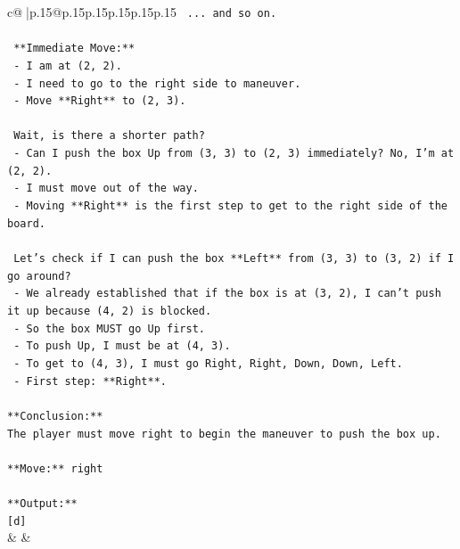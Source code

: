 \documentclass{article}
\begin{document}
{\begin{supertabular}{c@{$\;$}|p{.15\linewidth}@{}p{.15\linewidth}p{.15\linewidth}p{.15\linewidth}p{.15\linewidth}p{.15\linewidth}}
{{{\texttt{    ... and so on.} \\
\\ 
\texttt{    **Immediate Move:**} \\
\texttt{    {-} I am at (2, 2).} \\
\texttt{    {-} I need to go to the right side to maneuver.} \\
\texttt{    {-} Move **Right** to (2, 3).} \\
\\ 
\texttt{    Wait, is there a shorter path?} \\
\texttt{    {-} Can I push the box Up from (3, 3) to (2, 3) immediately? No, I'm at (2, 2).} \\
\texttt{    {-} I must move out of the way.} \\
\texttt{    {-} Moving **Right** is the first step to get to the right side of the board.} \\
\\ 
\texttt{    Let's check if I can push the box **Left** from (3, 3) to (3, 2) if I go around?} \\
\texttt{    {-} We already established that if the box is at (3, 2), I can't push it up because (4, 2) is blocked.} \\
\texttt{    {-} So the box MUST go Up first.} \\
\texttt{    {-} To push Up, I must be at (4, 3).} \\
\texttt{    {-} To get to (4, 3), I must go Right, Right, Down, Down, Left.} \\
\texttt{    {-} First step: **Right**.} \\
\\ 
\texttt{**Conclusion:**} \\
\texttt{The player must move right to begin the maneuver to push the box up.} \\
\\ 
\texttt{**Move:** right} \\
\\ 
\texttt{**Output:**} \\
\texttt{{[}d{]}} \\
            }
        }
    }
    & & \\ \\


\end{supertabular}}
\end{document}
